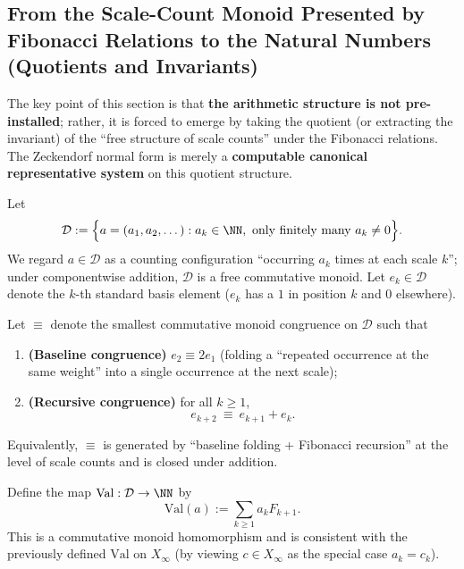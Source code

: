\subsection{From the Scale-Count Monoid Presented by Fibonacci Relations to the Natural Numbers (Quotients and Invariants)}\label{subsec:emergent-arithmetic-fib-congruence}

The key point of this section is that \textbf{the arithmetic structure is not pre-installed}; rather, it is forced to emerge by taking the quotient (or extracting the invariant) of the ``free structure of scale counts'' under the Fibonacci relations. The Zeckendorf normal form is merely a \textbf{computable canonical representative system} on this quotient structure.

Let
\[
\mathcal{D}:=\Bigl\{a=(a_1,a_2,\dots): a_k\in\NN,\ \text{only finitely many }a_k\neq 0\Bigr\}.
\]
We regard $a\in\mathcal{D}$ as a counting configuration ``occurring $a_k$ times at each scale $k$''; under componentwise addition, $\mathcal{D}$ is a free commutative monoid.
Let $e_k\in\mathcal{D}$ denote the $k$-th standard basis element ($e_k$ has a $1$ in position $k$ and $0$ elsewhere).

\begin{definition}\label{def:fib-congruence}
Let $\equiv$ denote the smallest commutative monoid congruence on $\mathcal{D}$ such that
\begin{enumerate}
  \item \textbf{(Baseline congruence)} $e_2\equiv 2e_1$ (folding a ``repeated occurrence at the same weight'' into a single occurrence at the next scale);
  \item \textbf{(Recursive congruence)} for all $k\ge 1$,
\[
e_{k+2}\ \equiv\ e_{k+1}+e_k.
\]
\end{enumerate}
Equivalently, $\equiv$ is generated by ``baseline folding + Fibonacci recursion'' at the level of scale counts and is closed under addition.
\end{definition}

\begin{definition}\label{def:val-on-D}
Define the map $\mathrm{Val}:\mathcal{D}\to\NN$ by
\[
\mathrm{Val}(a):=\sum_{k\ge 1} a_k F_{k+1}.
\]
This is a commutative monoid homomorphism and is consistent with the previously defined $\mathrm{Val}$ on $X_\infty$ (by viewing $c\in X_\infty$ as the special case $a_k=c_k$).
\end{definition}

